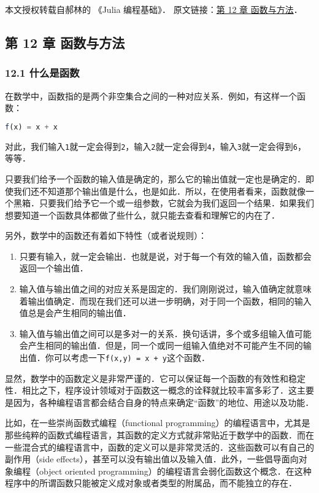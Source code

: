 
本文授权转载自郝林的 《Julia 编程基础》． 原文链接：\href{https://github.com/hyper0x/JuliaBasics/blob/master/book/ch11.md}{第 12 章 函数与方法}．

\subsection{第 12 章 函数与方法}

\subsubsection{12.1 什么是函数}

在数学中，函数指的是两个非空集合之间的一种对应关系．例如，有这样一个函数：

\begin{lstlisting}[language=julia]
f(x) = x + x
\end{lstlisting}

对此，我们输入\verb|1|就一定会得到\verb|2|，输入\verb|2|就一定会得到\verb|4|，输入\verb|3|就一定会得到\verb|6|，等等．

只要我们给予一个函数的输入值是确定的，那么它的输出值就一定也是确定的．即使我们还不知道那个输出值是什么，也是如此．所以，在使用者看来，函数就像一个黑箱．只要我们给予它一个或一组参数，它就会为我们返回一个结果．如果我们想要知道一个函数具体都做了些什么，就只能去查看和理解它的内在了．

另外，数学中的函数还有着如下特性（或者说规则）：

\begin{enumerate}
\item 只要有输入，就一定会输出．也就是说，对于每一个有效的输入值，函数都会返回一个输出值．
\item 输入值与输出值之间的对应关系是固定的．我们刚刚说过，输入值确定就意味着输出值确定．而现在我们还可以进一步明确，对于同一个函数，相同的输入值总是会产生相同的输出值．
\item 输入值与输出值之间可以是多对一的关系．换句话讲，多个或多组输入值可能会产生相同的输出值．但是，同一个或同一组输入值绝对不可能产生不同的输出值．你可以考虑一下\verb|f(x,y) = x + y|这个函数．
\end{enumerate}

显然，数学中的函数定义是非常严谨的．它可以保证每一个函数的有效性和稳定性．相比之下，程序设计领域对于函数这一概念的诠释就比较丰富多彩了．这主要是因为，各种编程语言都会结合自身的特点来确定“函数”的地位、用途以及功能．

比如，在一些崇尚函数式编程（functional programming）的编程语言中，尤其是那些纯粹的函数式编程语言，其函数的定义方式就非常贴近于数学中的函数．而在一些混合式的编程语言中，函数的定义可以是非常灵活的．这些函数可以有自己的副作用（side effects），甚至可以没有输出值以及输入值．此外，一些倡导面向对象编程（object oriented programming）的编程语言会弱化函数这个概念．在这种程序中的所谓函数只能被定义成对象或者类型的附属品，而不能独立的存在．


